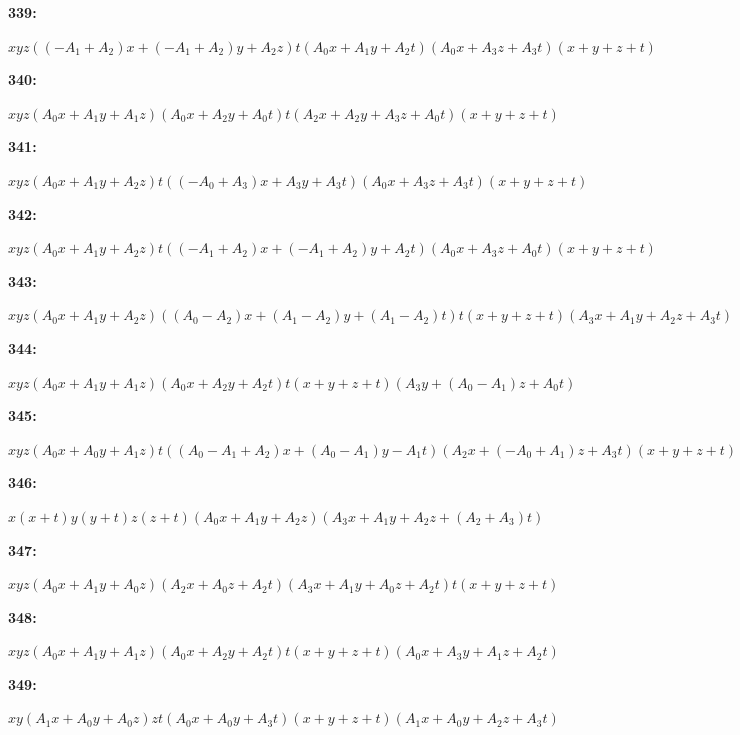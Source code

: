 \documentclass[12pt]{amsart}
\theoremstyle{plain}
\theoremstyle{remark}
\theoremstyle{definition}
\numberwithin{table}{section}
\begin{document}
\noindent\parbox[right]{9mm}{\textbf{339:}}\parbox{3mm}{\hfill}%
\parbox[t]{15cm}{\(xyz((-A_{1} + A_{2})x + (-A_{1} + A_{2})y + A_{2}z)t(A_{0}x + A_{1}y + A_{2}t)(A_{0}x + A_{3}z + A_{3}t)(x + y + z + t)\)}

\noindent\parbox[right]{9mm}{\textbf{340:}}\parbox{3mm}{\hfill}%
\parbox[t]{15cm}{\(xyz(A_{0}x + A_{1}y + A_{1}z)(A_{0}x + A_{2}y + A_{0}t)t(A_{2}x + A_{2}y + A_{3}z + A_{0}t)(x + y + z + t)\)}

\noindent\parbox[right]{9mm}{\textbf{341:}}\parbox{3mm}{\hfill}%
\parbox[t]{15cm}{\(xyz(A_{0}x + A_{1}y + A_{2}z)t((-A_{0} + A_{3})x + A_{3}y + A_{3}t)(A_{0}x + A_{3}z + A_{3}t)(x + y + z + t)\)}

\noindent\parbox[right]{9mm}{\textbf{342:}}\parbox{3mm}{\hfill}%
\parbox[t]{15cm}{\(xyz(A_{0}x + A_{1}y + A_{2}z)t((-A_{1} + A_{2})x + (-A_{1} + A_{2})y + A_{2}t)(A_{0}x + A_{3}z + A_{0}t)(x + y + z + t)\)}

\noindent\parbox[right]{9mm}{\textbf{343:}}\parbox{3mm}{\hfill}%
\parbox[t]{15cm}{\(xyz(A_{0}x + A_{1}y + A_{2}z)((A_{0} - A_{2})x + (A_{1} - A_{2})y + (A_{1} - A_{2})t)t(x + y + z + t)(A_{3}x + A_{1}y + A_{2}z + A_{3}t)\)}

\noindent\parbox[right]{9mm}{\textbf{344:}}\parbox{3mm}{\hfill}%
\parbox[t]{15cm}{\(xyz(A_{0}x + A_{1}y + A_{1}z)(A_{0}x + A_{2}y + A_{2}t)t(x + y + z + t)(A_{3}y + (A_{0} - A_{1})z + A_{0}t)\)}

\noindent\parbox[right]{9mm}{\textbf{345:}}\parbox{3mm}{\hfill}%
\parbox[t]{15cm}{\(xyz(A_{0}x + A_{0}y + A_{1}z)t((A_{0} - A_{1} + A_{2})x + (A_{0} - A_{1})y - A_{1}t)(A_{2}x + (-A_{0} + A_{1})z + A_{3}t)(x + y + z + t)\)}

\noindent\parbox[right]{9mm}{\textbf{346:}}\parbox{3mm}{\hfill}%
\parbox[t]{15cm}{\(x(x + t)y(y + t)z(z + t)(A_{0}x + A_{1}y + A_{2}z)(A_{3}x + A_{1}y + A_{2}z + (A_{2} + A_{3})t)\)}

\noindent\parbox[right]{9mm}{\textbf{347:}}\parbox{3mm}{\hfill}%
\parbox[t]{15cm}{\(xyz(A_{0}x + A_{1}y + A_{0}z)(A_{2}x + A_{0}z + A_{2}t)(A_{3}x + A_{1}y + A_{0}z + A_{2}t)t(x + y + z + t)\)}

\noindent\parbox[right]{9mm}{\textbf{348:}}\parbox{3mm}{\hfill}%
\parbox[t]{15cm}{\(xyz(A_{0}x + A_{1}y + A_{1}z)(A_{0}x + A_{2}y + A_{2}t)t(x + y + z + t)(A_{0}x + A_{3}y + A_{1}z + A_{2}t)\)}

\noindent\parbox[right]{9mm}{\textbf{349:}}\parbox{3mm}{\hfill}%
\parbox[t]{15cm}{\(xy(A_{1}x + A_{0}y + A_{0}z)zt(A_{0}x + A_{0}y + A_{3}t)(x + y + z + t)(A_{1}x + A_{0}y + A_{2}z + A_{3}t)\)}
\end{document}
